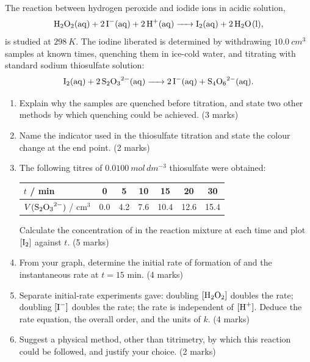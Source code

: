 \documentclass[11pt]{article}
\newcounter{popsec}
\newcounter{popsub}
\newcommand{\courssub}[1]{%
  \stepcounter{popsub}%
  \par\vspace{9pt}\noindent{\popxbold\fontsize{11.5}{13}\selectfont\color{popink}{\color{poporange}\thepopsec.\thepopsub}\hspace{6pt}#1}\par\nopagebreak\vspace{4pt}
}
\begin{document}
\courssub{I prepare for the GCE}

\begin{exercice}
The reaction between hydrogen peroxide and iodide ions in acidic solution,
\[
\ce{H2O2(aq) + 2I-(aq) + 2H+(aq) -> I2(aq) + 2H2O(l)},
\]
is studied at $\SI{298}{K}$. The iodine liberated is determined by withdrawing $\SI{10.0}{cm^{3}}$ samples at known times, quenching them in ice-cold water, and titrating with standard sodium thiosulfate solution:
\[
\ce{I2(aq) + 2S2O3^{2-}(aq) -> 2I-(aq) + S4O6^{2-}(aq)}.
\]
\begin{enumerate}
\item Explain why the samples are quenched before titration, and state two other methods by which quenching could be achieved. \hfill (3 marks)
\item Name the indicator used in the thiosulfate titration and state the colour change at the end point. \hfill (2 marks)
\item The following titres of $\SI{0.0100}{mol\,dm^{-3}}$ thiosulfate were obtained:
\begin{center}
\begin{tabular}{|l|c|c|c|c|c|c|}
\hline
\rowcolor{popblueL} $t$ / min & 0 & 5 & 10 & 15 & 20 & 30 \\
\hline $V(\ce{S2O3^{2-}})$ / $\mathrm{cm^{3}}$ & 0.0 & 4.2 & 7.6 & 10.4 & 12.6 & 15.4 \\
\hline
\end{tabular}
\end{center}
Calculate the concentration of  in the reaction mixture at each time and plot $[\ce{I2}]$ against $t$. \hfill (5 marks)
\item From your graph, determine the initial rate of formation of  and the instantaneous rate at $t = 15$ min. \hfill (4 marks)
\item Separate initial-rate experiments gave: doubling $[\ce{H2O2}]$ doubles the rate; doubling $[\ce{I-}]$ doubles the rate; the rate is independent of $[\ce{H+}]$. Deduce the rate equation, the overall order, and the units of $k$. \hfill (4 marks)
\item Suggest a physical method, other than titrimetry, by which this reaction could be followed, and justify your choice. \hfill (2 marks)
\end{enumerate}
\end{exercice}
\end{document}
